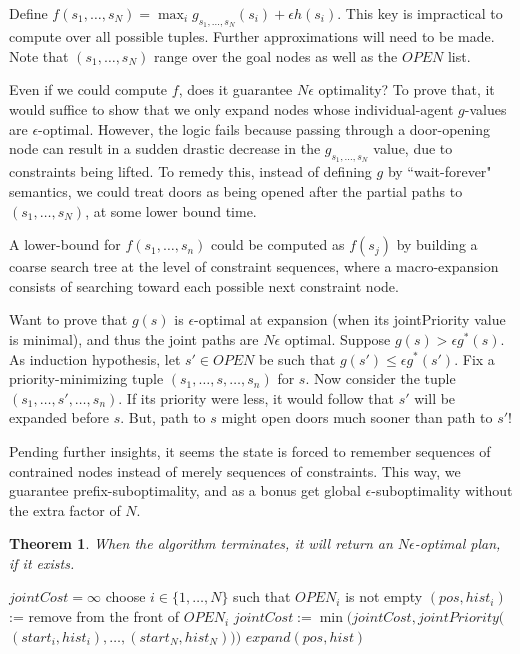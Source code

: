 \documentclass[letterpaper]{article}
\newtheorem{thm}{Theorem}
\begin{document}
Define $f(s_1,\ldots,s_N) = \max_i g_{s_1,\ldots,s_N}(s_i) + \epsilon h(s_i)$. This key is impractical to compute over all possible tuples. Further approximations will need to be made. Note that $(s_1,\ldots,s_N)$ range over the goal nodes as well as the $OPEN$ list.

Even if we could compute $f$, does it guarantee $N\epsilon$ optimality? To prove that, it would suffice to show that we only expand nodes whose individual-agent $g$-values are $\epsilon$-optimal. However, the logic fails because passing through a door-opening node can result in a sudden drastic decrease in the $g_{s_1,\ldots,s_N}$ value, due to constraints being lifted. To remedy this, instead of defining $g$ by ``wait-forever" semantics, we could treat doors as being opened after the partial paths to $(s_1,\ldots,s_N)$, at some lower bound time.

A lower-bound for $f(s_1,\ldots,s_n)$ could be computed as $f(s_j)$ by building a coarse search tree at the level of constraint sequences, where a macro-expansion consists of searching toward each possible next constraint node.

Want to prove that $g(s)$ is $\epsilon$-optimal at expansion (when its jointPriority value is minimal), and thus the joint paths are $N\epsilon$ optimal. Suppose $g(s) > \epsilon g^*(s)$. As induction hypothesis, let $s'\in OPEN$ be such that $g(s') \le \epsilon g^*(s')$. Fix a priority-minimizing tuple $(s_1,\ldots,s,\ldots,s_n)$ for $s$. Now consider the tuple $(s_1,\ldots,s',\ldots,s_n)$. If its priority were less, it would follow that $s'$ will be expanded before $s$. But, path to $s$ might open doors much sooner than path to $s'$!

Pending further insights, it seems the state is forced to remember sequences of contrained nodes instead of merely sequences of constraints. This way, we guarantee prefix-suboptimality, and as a bonus get global $\epsilon$-suboptimality without the extra factor of $N$.

\begin{thm}
When the algorithm terminates, it will return an $N\epsilon$-optimal plan, if it exists.
\end{thm}

\begin{algorithm}
\caption{$search()$}
\label{alg:update}
\begin{algorithmic}
\STATE $jointCost = \infty$
\STATE choose $i\in\{1,\ldots,N\}$ such that $OPEN_{i}$ is not empty
\STATE $(pos, hist_i)$ := remove from the front of $OPEN_{i}$
\STATE $jointCost := \min(jointCost,jointPriority($\\\qquad$(start_i,hist_i),\ldots,(start_N,hist_N)))$
\ENDFOR
\ENDIF
\STATE $expand(pos, hist)$
\ENDWHILE
\end{algorithmic}
\end{algorithm}
\end{document}

